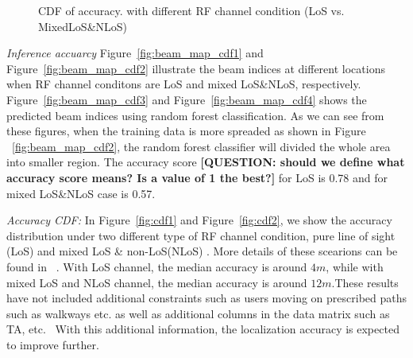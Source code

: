 \documentclass[conference, 10pt]{IEEEtran}
\begin{document}
\begin{figure}[t]
\begin{center}
\caption{CDF of accuracy.\label{fig:leapperf} with different RF channel condition (LoS vs. MixedLoS\&NLoS)}
\end{center}
\end{figure}
{\em Inference accuarcy} 
Figure~\ref{fig:beam_map_cdf1} and Figure~\ref{fig:beam_map_cdf2} illustrate the beam indices at different locations when RF channel conditons are LoS and mixed LoS\&NLoS, respectively. Figure~\ref{fig:beam_map_cdf3} and Figure~\ref{fig:beam_map_cdf4}
shows the predicted beam indices using random forest classification. As we can see from these figures, when the training data is more spreaded as shown in Figure ~\ref{fig:beam_map_cdf2},
the random forest classifier will divided the whole area into smaller region. The accuracy score \textbf{[QUESTION: should we define what accuracy score means? Is a value of 1 the best?]}  for LoS is 0.78 and for mixed LoS\&NLoS case is 0.57.

{\em Accuracy CDF:} In Figure~\ref{fig:cdf1} and Figure~\ref{fig:cdf2}, we show the
accuracy distribution under two different type of RF channel condition, pure line of sight (LoS) and mixed LoS \& non-LoS(NLoS) . More details of these scearions can be found in 
~\cite{3gpp38901}. With LoS channel, the median accuracy is around
$4m$, while with mixed LoS and NLoS channel, the median accuracy is around $12m$.These results have not included additional constraints such as users moving on prescribed paths such as walkways etc. as well as additional columns in the data matrix such as TA, etc. 
With this additional information, the localization accuracy is expected to improve further.
\end{document}
